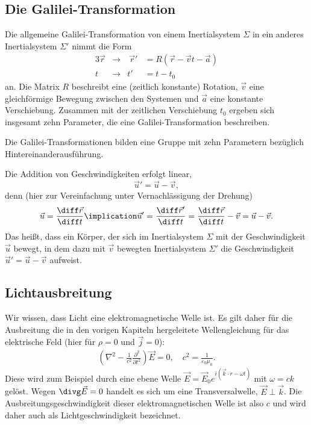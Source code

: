 \subsection{Die Galilei-Transformation}

Die allgemeine Galilei-Transformation von einem Inertialsystem $\Sigma$ in ein anderes Inertialsystem $\Sigma'$ nimmt die Form
\begin{alignat*}{3}
    \vec r & \rightarrow & \:\vec r' & = R(\vec r-\vec vt-\vec a) \\
    t      & \rightarrow & t'        & = t-t_0
\end{alignat*}
an. Die Matrix $R$ beschreibt eine (zeitlich konstante) Rotation, $\vec v$ eine gleichförmige Bewegung zwischen den Systemen und $\vec a$ eine konstante Verschiebung. Zusammen mit der zeitlichen Verschiebung $t_0$ ergeben sich insgesamt zehn Parameter, die eine Galilei-Transformation beschreiben.

\begin{formal}
    Die Galilei-Transformationen bilden eine Gruppe mit zehn Parametern bezüglich Hintereinanderausführung.
\end{formal}


Die Addition von Geschwindigkeiten erfolgt linear,
\begin{equation*}
    \vec u' = \vec u - \vec v,
\end{equation*}
denn (hier zur Vereinfachung unter Vernachlässigung der Drehung)
\begin{align*}
    \vec u = \frac{\diff\vec r}{\diff t} \implication \vec u' = \frac{\diff\vec r'}{\diff t} = \frac{\diff\vec r}{\diff t}-\vec v= \vec u - \vec v.
\end{align*}
Das heißt, dass ein Körper, der sich im Inertialsystem $\Sigma$ mit der Geschwindigkeit $\vec u$ bewegt, in dem dazu mit $\vec v$ bewegten Inertialsystem $\Sigma'$ die Geschwindigkeit $\vec u'=\vec u-\vec v$ aufweist.


\subsection{Lichtausbreitung}

Wir wissen, dass Licht eine elektromagnetische Welle ist. Es gilt daher für die Ausbreitung die in den vorigen Kapiteln hergeleitete Wellengleichung für das elektrische Feld (hier für $\rho=0$ und $\vec j=0$):
\begin{align}
    \label{eq:wellengleichung_e}
    \left(\nabla^2-\frac{1}{c^2}\frac{\partial^2}{\partial t^2}\right) \vec E=0, \quad c^2=\frac{1}{\varepsilon_0\mu_0}.
\end{align}
Diese wird zum Beispiel durch eine ebene Welle $\vec E=\vec E_0 e^{i(\vec k\cdot r-\omega t)}$ mit $\omega=ck$ gelöst. Wegen $\divg \vec E =0$ handelt es sich um eine Transversalwelle, $\vec E\perp \vec k$. Die Ausbreitungsgeschwindigkeit dieser elektromagnetischen Welle ist also $c$ und wird daher auch als Lichtgeschwindigkeit bezeichnet.

